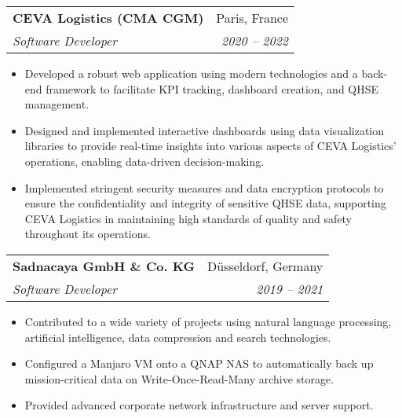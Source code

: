 \documentclass[a4paper,11pt]{article}
\makeatletter
\newcommand{\resumeItem}[2]{
  \item\small{
    \textbf{#1}{ #2 \vspace{-2pt}}
  }
}
\newcommand{\resumeSubheading}[4]{
  \vspace{-1pt}\item
    \begin{tabular*}{0.97\textwidth}{l@{\extracolsep{\fill}}r}
      \textbf{#1} & #2 \\
      \textit{\small#3} & \textit{\small #4} \\
    \end{tabular*}\vspace{-5pt}
}
\newcommand{\resumeItemListStart}{\begin{itemize}}
\newcommand{\resumeItemListEnd}{\end{itemize}\vspace{-5pt}}
\makeatother
\begin{document}
\iffalse
    \resumeSubheading
    {Hoffmann ai}{Paris, France}
    {Founder \& Software Engineer}{2020 -- Present}
    \resumeItemListStart
      \resumeItem{Spotmydive}
        {Wrote client-side code for web-based high-volume production application (120,000 unique visitors/mo). Improved conversion rate by 20\%.}
      \resumeItem{Orange Bank}
        {Designed, created and maintained a scalable web-based customer management app (TypeScript). Reduced customer acquisition cost by 10\%.}
      \resumeItem{CEVA Logistics}
        {Designed, developed, and maintained the front-end (ReactJS) and back-end (C\#) for highly available web application. Improved QHSE compliance and monitoring by 50\%.}
    \resumeItemListEnd
\fi

    \resumeSubheading
    {CEVA Logistics (CMA CGM)}{Paris, France}
    {Software Developer}{2020 -- 2022}
    \resumeItemListStart
      \resumeItem{}
        {Developed a robust web application using modern technologies and a back-end framework to facilitate KPI tracking, dashboard creation, and QHSE management.}
      \resumeItem{}
        {Designed and implemented interactive dashboards using data visualization libraries to provide real-time insights into various aspects of CEVA Logistics' operations, enabling data-driven decision-making.}
      \resumeItem{}
        {Implemented stringent security measures and data encryption protocols to ensure the confidentiality and integrity of sensitive QHSE data, supporting CEVA Logistics in maintaining high standards of quality and safety throughout its operations.}
    \resumeItemListEnd

\iffalse
    \resumeSubheading
    {Deutsche Telekom}{Bonn, Germany}
    {Digital Competence Instructor}{2021}
    \resumeItemListStart
      \resumeItem{}
        {Completed coursework modules encompassing various programming languages commonly used in web development, such as HTML, CSS, JavaScript, and frameworks like React and Angular.}
      \resumeItem{}
        {Explored the intricacies of network security within the context of web development, delving into concepts such as secure authentication, encryption, and protection against common web vulnerabilities.}
    \resumeItemListEnd
\fi   
      
    \resumeSubheading
    {Sadnacaya GmbH \& Co. KG}{Düsseldorf, Germany}
    {Software Developer}{2019 -- 2021}
    \resumeItemListStart
      \resumeItem{}
        {Contributed to a wide variety of projects using natural language processing, artificial intelligence, data compression and search technologies.}
      \resumeItem{}
        {Configured a Manjaro VM onto a QNAP NAS to automatically back up mission-critical data on Write-Once-Read-Many archive storage.}
      \resumeItem{}
        {Provided advanced corporate network infrastructure and server support.}
    \resumeItemListEnd
\end{document}
